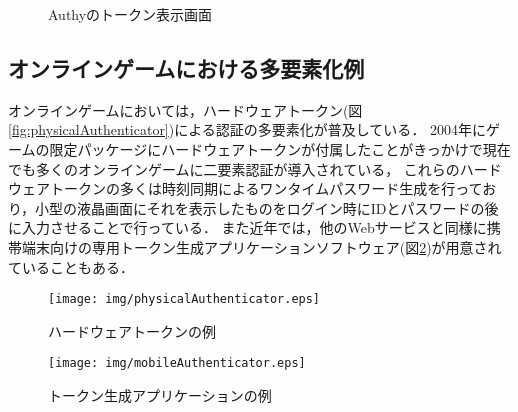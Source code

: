 \begin{figure}[ht]
\begin{center}
\end{center}
\caption{Authyのトークン表示画面}
\label{fig:authyiPhone}
\end{figure}

\subsection{オンラインゲームにおける多要素化例}
オンラインゲームにおいては，ハードウェアトークン(図\ref{fig:physicalAuthenticator})による認証の多要素化が普及している\cite{arXiv:1309.5344}．
2004年にゲームの限定パッケージにハードウェアトークンが付属した\cite{onlinegameSecurity}ことがきっかけで現在でも多くのオンラインゲームに二要素認証が導入されている，
これらのハードウェアトークンの多くは時刻同期によるワンタイムパスワード生成を行っており，小型の液晶画面にそれを表示したものをログイン時にIDとパスワードの後に入力させることで行っている．
また近年では，他のWebサービスと同様に携帯端末向けの専用トークン生成アプリケーションソフトウェア(図\ref{fig:mobileAuthenticator})が用意されていることもある．

\begin{figure}[ht]

\begin{minipage}{0.5\hsize}
\begin{center}
\texttt{[image: img/physicalAuthenticator.eps]}
\end{center}
\caption{ハードウェアトークンの例}
\label{fig:physicalAuthenticator}
\end{minipage}
\begin{minipage}{0.5\hsize}
\begin{center}
\texttt{[image: img/mobileAuthenticator.eps]}
\end{center}
\caption{トークン生成アプリケーションの例}
\label{fig:mobileAuthenticator}
\end{minipage}

\end{figure}


\newpage
